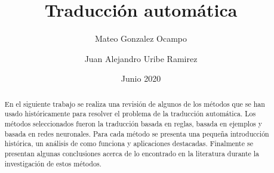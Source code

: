 \documentclass[12pt, letterpaper]{article}
\title{Traducción automática}
\author{Mateo Gonzalez Ocampo \and Juan Alejandro Uribe Ramirez}
\date{Junio 2020}
\begin{document}
    \maketitle
    \begin{abstract}
        En el siguiente trabajo se realiza una revisión de algunos de los métodos que se han usado históricamente para resolver el problema de la 
        traducción automática. Los métodos seleccionados fueron la traducción basada en reglas, basada en ejemplos y basada en redes neuronales.
        Para cada método se presenta una pequeña introducción histórica, un análisis de como funciona y aplicaciones destacadas. Finalmente se presentan 
        algunas conclusiones acerca de lo encontrado en la literatura durante la investigación de estos métodos.

    \end{abstract}
\end{document}
